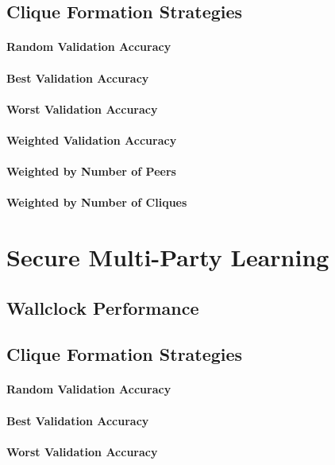 \subsection{Clique Formation Strategies}
\paragraph{Random Validation Accuracy}
\paragraph{Best Validation Accuracy}
\paragraph{Worst Validation Accuracy}
\paragraph{Weighted Validation Accuracy}
\paragraph{Weighted by Number of Peers}
\paragraph{Weighted by Number of Cliques}

\section{Secure Multi-Party Learning}
\subsection{Wallclock Performance}
\subsection{Clique Formation Strategies}
\paragraph{Random Validation Accuracy}
\paragraph{Best Validation Accuracy}
\paragraph{Worst Validation Accuracy}
